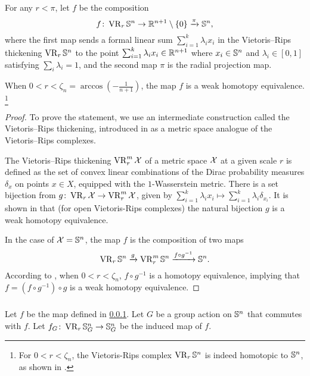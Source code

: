\subsubsection{}
\label{subsub:f}

For any $r<\pi$, let $f$ be the composition
\[
f \colon \operatorname{VR}_r\mathbb{S}^n \to \mathbb{R}^{n+1} \setminus \{0\} \xrightarrow{\pi} \mathbb{S}^n,
\]
where the first map sends a formal linear sum $\sum_{i=1}^k \lambda_i x_i$ in the Vietoris--Rips thickening $\operatorname{VR}_r\mathbb{S}^n$ to the point $\sum_{i=1}^k \lambda_i x_i \in \mathbb{R}^{n+1}$ where $x_i \in \mathbb{S}^n$ and $\lambda_i \in [0,1]$ satisfying $\sum_i\lambda_i=1$, and the second map $\pi$ is the radial projection map.

\medskip\lemma
When $0<r<\zeta_n=\arccos{(-\tfrac{1}{n+1})}$, the map $f$ is a weak homotopy equivalence.
\footnote{For $0<r<\zeta_n$, the Vietoris-Rips complex $\operatorname{VR}_r\mathbb{S}^n$ is indeed homotopic to $\mathbb{S}^n$, as shown in \cite[Theorem 7.1]{lim2020vietoris}.}

\begin{proof}
	To prove the statement, we use an intermediate construction called the Vietoris--Rips thickening, introduced in \cite{adamaszek2018metric} as a metric space analogue of the Vietoris--Rips complexes.

	The Vietoris--Rips thickening $\operatorname{VR}_r^m\mathcal{X}$ of a metric space $\mathcal{X}$ at a given scale $r$ is defined as the set of convex linear combinations of the Dirac probability measures $\delta_{x}$ on points $x \in X$, equipped with the $1$-Wasserstein metric.
	There is a set bijection from $g \colon \operatorname{VR}_r\mathcal{X} \to \operatorname{VR}_r^m\mathcal{X}$, given by $\sum_{i=1}^k\lambda_i x_i\mapsto \sum_{i=1}^k\lambda_i\delta_{x_i}.$
	It is shown in \cite[Theorem 1]{gillespie2024vietoris} that (for open Vietoris-Rips complexes) the natural bijection $g$ is a weak homotopy equivalence.

	In the case of $\mathcal{X} = \mathbb{S}^n$, the map $f$ is the composition of two maps
	\[\operatorname{VR}_r\mathbb{S}^n\xrightarrow{g}\operatorname{VR}_r^m\mathbb{S}^n\xrightarrow{f \circ g^{-1}}\mathbb{S}^n.\]
	According to \cite[Proposition 5.3]{adamaszek2018metric}, when $0<r<\zeta_n$, $f \circ g^{-1}$ is a homotopy equivalence, implying that $f = (f \circ g^{-1}) \circ g$ is a weak homotopy equivalence.
\end{proof}

\subsubsection{}
\label{subsub:rho}
Let $f$ be the map defined in \cref{subsub:f}.
Let $G$ be a group action on $\mathbb{S}^n$ that commutes with $f$.
Let $f_G \colon \operatorname{VR}_r\mathbb{S}^n_G \to \mathbb{S}^n_G$ be the induced map of $f$.

